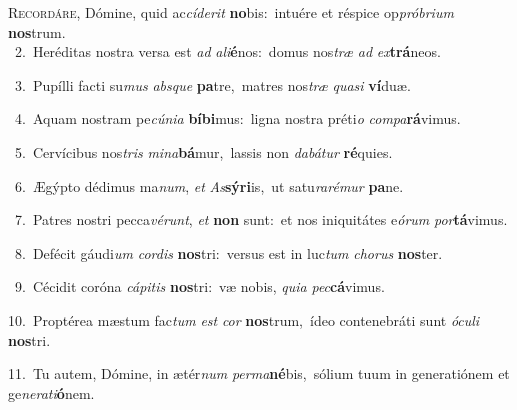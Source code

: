 \lettrine{\initial\textcolor{\initialcolor}{R}}{ecordáre,} Dómine, quid ac\-\textit{cí}\-\textit{de}\textit{rit} \textbf{no}\-bis:~\star intuére et réspice op\-\textit{pró}\-\textit{bri}\textit{um} \textbf{nos}\-trum.\\
{\numbfont\textcolor{\numbcolor}{~2.}}~Heréditas nostra versa est \textit{ad} \textit{a}\-\textit{li}\textbf{é}nos:~\star domus nos\textit{træ} \textit{ad} \textit{ex}\-\textbf{trá}neos.\par
{\numbfont\textcolor{\numbcolor}{~3.}}~Pupílli facti su\textit{mus} \textit{abs}\-\textit{que} \textbf{pa}\-tre,~\star matres nos\textit{træ} \textit{qua}\-\textit{si} \textbf{ví}\-duæ.\par
{\numbfont\textcolor{\numbcolor}{~4.}}~Aquam nostram pe\-\textit{cú}\-\textit{ni}\textit{a} \textbf{bí}\-\textbf{bi}mus:~\star ligna nostra préti\textit{o} \textit{com}\-\textit{pa}\textbf{rá}vimus.\par
{\numbfont\textcolor{\numbcolor}{~5.}}~Cervícibus nos\textit{tris} \textit{mi}\-\textit{na}\textbf{bá}mur,~\star lassis non \textit{da}\-\textit{bá}\textit{tur} \textbf{ré}\-quies.\par
{\numbfont\textcolor{\numbcolor}{~6.}}~Ægýpto dédimus ma\-\textit{num}\-, \textit{et} \textit{As}\-\textbf{sý}\textbf{ri}is,~\star ut satu\-\textit{ra}\-\textit{ré}\textit{mur} \textbf{pa}\-ne.\par
{\numbfont\textcolor{\numbcolor}{~7.}}~Patres nostri pecca\-\textit{vé}\-\textit{runt}, \textit{et} \textbf{non} sunt:~\star et nos iniquitátes e\-\textit{ó}\-\textit{rum} \textit{por}\-\textbf{tá}vimus.\par
{\numbfont\textcolor{\numbcolor}{~8.}}~Defécit gáudi\textit{um} \textit{cor}\-\textit{dis} \textbf{nos}\-tri:~\star versus est in luc\textit{tum} \textit{cho}\-\textit{rus} \textbf{nos}\-ter.\par
{\numbfont\textcolor{\numbcolor}{~9.}}~Cécidit coróna \textit{cá}\-\textit{pi}\textit{tis} \textbf{nos}\-tri:~\star væ nobis, \textit{qui}\-\textit{a} \textit{pec}\-\textbf{cá}vimus.\par
{\numbfont\textcolor{\numbcolor}{10.}}~Proptérea mæstum fac\textit{tum} \textit{est} \textit{cor} \textbf{nos}\-trum,~\star ídeo contenebráti sunt \textit{ó}\-\textit{cu}\textit{li} \textbf{nos}\-tri.\par
{\numbfont\textcolor{\numbcolor}{11.}}~Tu autem, Dómine, in ætér\textit{num} \textit{per}\-\textit{ma}\textbf{né}bis,~\star sólium tuum in generatiónem et ge\-\textit{ne}\-\textit{ra}\textit{ti}\textbf{ó}nem.\par
